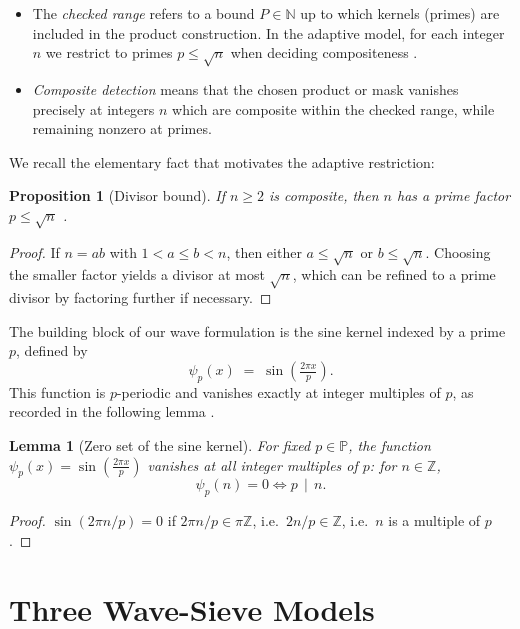 \documentclass[12pt]{article}
\newtheorem{lemma}{Lemma}
\newtheorem{proposition}{Proposition}
\theoremstyle{definition}
\theoremstyle{remark}
\newcommand{\N}{\mathbb{N}}
\newcommand{\Z}{\mathbb{Z}}
\newcommand{\Primes}{\mathbb{P}}
\newcommand{\divides}{\,\mid\,}
\begin{document}
\begin{itemize}
    \item The \emph{checked range} refers to a bound $P \in \N$ up to which kernels (primes) are included in the product construction. 
    In the adaptive model, for each integer $n$ we restrict to primes $p \le \sqrt{n}$ when deciding compositeness \citep{tenenbaum2015analytic}.
    \item \emph{Composite detection} means that the chosen product or mask vanishes precisely at integers $n$ which are composite within the checked range, while remaining nonzero at primes.
\end{itemize}

We recall the elementary fact that motivates the adaptive restriction:

\begin{proposition}[Divisor bound]\label{prop:divisor}
If $n \ge 2$ is composite, then $n$ has a prime factor $p \le \sqrt{n}$ \citep{burton2010elementary}.
\end{proposition}
\begin{proof}
If $n = ab$ with $1 < a \le b < n$, then either $a \le \sqrt{n}$ or $b \le \sqrt{n}$. 
Choosing the smaller factor yields a divisor at most $\sqrt{n}$, which can be refined to a prime divisor by factoring further if necessary.
\end{proof}

The building block of our wave formulation is the sine kernel indexed by a prime $p$, defined by
\[
\psi_p(x) \;=\; \sin\!\left(\tfrac{2\pi x}{p}\right).
\]
This function is $p$-periodic and vanishes exactly at integer multiples of $p$, as recorded in the following lemma \citep{stein2003fourier}.

\begin{lemma}[Zero set of the sine kernel]\label{lem:sine-zero}
For fixed $p\in\Primes$, the function $\psi_p(x)=\sin\!\left(\tfrac{2\pi x}{p}\right)$ vanishes at all integer multiples of $p$: for $n\in\Z$,
\[
\psi_p(n)=0 \iff p \divides n.
\]
\end{lemma}
\begin{proof}
$\sin(2\pi n/p)=0$ if $2\pi n/p \in \pi\Z$, i.e.\ $2n/p \in \Z$, i.e.\ $n$ is a multiple of $p$.
\end{proof}

\section{Three Wave-Sieve Models}\label{sec:models}
\end{document}

